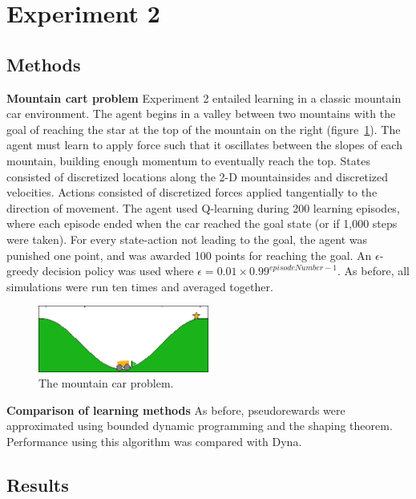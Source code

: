 \documentclass[letterpaper]{article}
\begin{document}
\section{Experiment 2}

\subsection{Methods}

\textbf{Mountain cart problem} Experiment 2 entailed learning in a classic mountain car environment. The agent begins in a valley between two mountains with the goal of reaching the star at the top of the mountain on the right (figure~\ref{fig:mc}). The agent must learn to apply force such that it oscillates between the slopes of each mountain, building enough momentum to eventually reach the top. States consisted of discretized locations along the 2-D mountainsides and discretized velocities. Actions consisted of discretized forces applied tangentially to the direction of movement. The agent used Q-learning during 200 learning episodes, where each episode ended when the car reached the goal state (or if 1,000 steps were taken). For every state-action not leading to the goal, the agent was punished one point, and was awarded 100 points for reaching the goal. An $\epsilon$-greedy decision policy was used where $\epsilon=0.01\times0.99^{episodeNumber-1}$. As before, all simulations were run ten times and averaged together.

\begin{figure}[ht]
\centering
\includegraphics[width=0.5\textwidth]{Mcar}
\caption{The mountain car problem.}
\label{fig:mc}
\end{figure}

\noindent
\textbf{Comparison of learning methods} As before, pseudorewards were approximated using bounded dynamic programming and the shaping theorem. Performance using this algorithm was compared with Dyna.

\subsection{Results}
\end{document}

